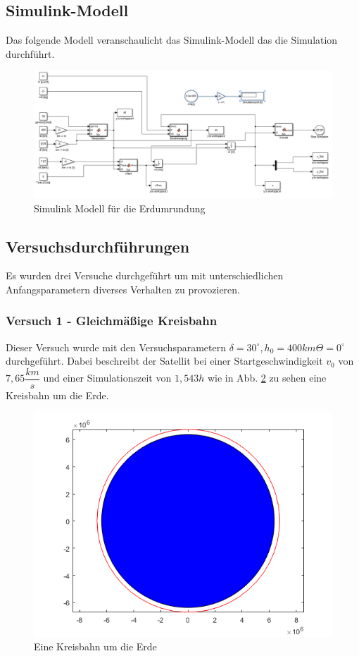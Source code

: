 \documentclass[]{scrartcl}
\begin{document}
\subsection{Simulink-Modell}

Das folgende Modell veranschaulicht das Simulink-Modell das die Simulation durchführt.

\begin{figure}[H]
\centering
\includegraphics[width=1\linewidth]{./Weltraum_1}
\caption{Simulink Modell für die Erdumrundung}
\label{fig:Weltraum}
\end{figure}

\subsection{Versuchsdurchführungen}
Es wurden drei Versuche durchgeführt um mit unterschiedlichen Anfangsparametern diverses Verhalten zu provozieren.

\subsubsection{Versuch 1 - Gleichmäßige Kreisbahn}

Dieser Versuch wurde mit den Versuchsparametern $\delta = 30^\circ, h_0 = 400km \Theta = 0^\circ $ durchgeführt. Dabei beschreibt der Satellit bei einer Startgeschwindigkeit $v_0$ von $7,65 \dfrac{km}{s}$ und einer Simulationszeit von $1,543h$  wie in Abb. \ref{fig:1_Kreisbahn} zu sehen eine Kreisbahn um die Erde.

\begin{figure}[H]
\centering
\includegraphics[width=1\linewidth]{./1_kreisbahn}
\caption{Eine Kreisbahn um die Erde}
\label{fig:1_Kreisbahn}
\end{figure}
\end{document}
